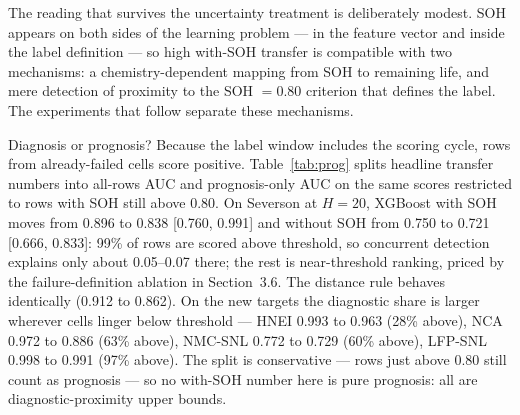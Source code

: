 \documentclass[preprint,12pt]{elsarticle}
\begin{document}
\begin{table}[!t]
\caption{GRU Transfer at H=20 on the Common Feature Set: Seed-Averaged Per-Cell AUC ($\pm$ SD Over Seeds 42, 1, 7).}
\label{tab:gru}
\centering
\small
{}
\end{table}

The reading that survives the uncertainty treatment is deliberately modest. SOH appears on both sides of the learning problem --- in the feature vector and inside the label definition --- so high with-SOH transfer is compatible with two mechanisms: a chemistry-dependent mapping from SOH to remaining life, and mere detection of proximity to the SOH $=0.80$ criterion that defines the label. The experiments that follow separate these mechanisms.

Diagnosis or prognosis? Because the label window includes the scoring cycle, rows from already-failed cells score positive. Table~\ref{tab:prog} splits headline transfer numbers into all-rows AUC and prognosis-only AUC on the same scores restricted to rows with SOH still above 0.80. On Severson at $H{=}20$, XGBoost with SOH moves from 0.896 to 0.838 [0.760, 0.991] and without SOH from 0.750 to 0.721 [0.666, 0.833]: 99\% of rows are scored above threshold, so concurrent detection explains only about 0.05--0.07 there; the rest is near-threshold ranking, priced by the failure-definition ablation in Section~3.6. The distance rule behaves identically (0.912 to 0.862). On the new targets the diagnostic share is larger wherever cells linger below threshold --- HNEI 0.993 to 0.963 (28\% above), NCA 0.972 to 0.886 (63\% above), NMC-SNL 0.772 to 0.729 (60\% above), LFP-SNL 0.998 to 0.991 (97\% above). The split is conservative --- rows just above 0.80 still count as prognosis --- so no with-SOH number here is pure prognosis: all are diagnostic-proximity upper bounds.
\end{document}
